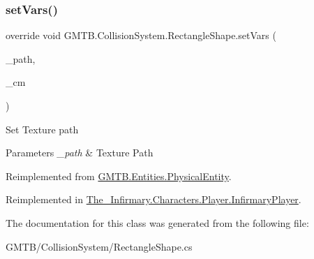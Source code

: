 \subsubsection{\texorpdfstring{setVars()}{setVars()}}
{\footnotesize\ttfamily override void G\+M\+T\+B.\+Collision\+System.\+Rectangle\+Shape.\+set\+Vars (\begin{DoxyParamCaption}\item[{string}]{\+\_\+path,  }\item[{\mbox{\hyperlink{interface_g_m_t_b_1_1_interfaces_1_1_i_content___manager}{I\+Content\+\_\+\+Manager}}}]{\+\_\+cm }\end{DoxyParamCaption})\hspace{0.3cm}{\ttfamily [virtual]}}



Set Texture path 


\begin{DoxyParams}{Parameters}
{\em \+\_\+path} & Texture Path\\
\hline
\end{DoxyParams}


Reimplemented from \mbox{\hyperlink{class_g_m_t_b_1_1_entities_1_1_physical_entity_add277bab26367c3364210b3577f6d7cd}{G\+M\+T\+B.\+Entities.\+Physical\+Entity}}.



Reimplemented in \mbox{\hyperlink{class_the___infirmary_1_1_characters_1_1_player_1_1_infirmary_player_a0833a307f7cb4ef7f1dd99f10e8db6e9}{The\+\_\+\+Infirmary.\+Characters.\+Player.\+Infirmary\+Player}}.



The documentation for this class was generated from the following file\+:\begin{DoxyCompactItemize}
\item 
G\+M\+T\+B/\+Collision\+System/Rectangle\+Shape.\+cs\end{DoxyCompactItemize}
